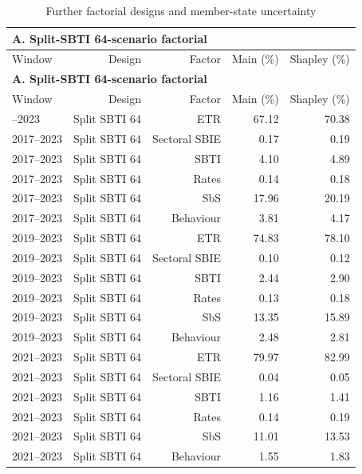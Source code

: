 {\small\setlength{\LTpre}{4pt}\setlength{\LTpost}{4pt}
\begin{longtable}{@{}lrrrr@{}}
\caption{Further factorial designs and member-state uncertainty}\label{tab:tab_v2_app_table5_country_uncertainty} \\
\multicolumn{5}{l}{\textbf{A. Split-SBTI 64-scenario factorial}} \\
\toprule
Window & Design & Factor & Main (\%) & Shapley (\%) \\
\midrule
\endfirsthead
\multicolumn{5}{l}{\textbf{A. Split-SBTI 64-scenario factorial}} \\
\toprule
Window & Design & Factor & Main (\%) & Shapley (\%) \\
\midrule
\endhead
\midrule
\endfoot
\bottomrule
\endlastfoot
2017–2023 & Split SBTI 64 & ETR & 67.12 & 70.38 \\
2017–2023 & Split SBTI 64 & Sectoral SBIE &  0.17 &  0.19 \\
2017–2023 & Split SBTI 64 & SBTI &  4.10 &  4.89 \\
2017–2023 & Split SBTI 64 & Rates &  0.14 &  0.18 \\
2017–2023 & Split SBTI 64 & SbS & 17.96 & 20.19 \\
2017–2023 & Split SBTI 64 & Behaviour &  3.81 &  4.17 \\
2019–2023 & Split SBTI 64 & ETR & 74.83 & 78.10 \\
2019–2023 & Split SBTI 64 & Sectoral SBIE &  0.10 &  0.12 \\
2019–2023 & Split SBTI 64 & SBTI &  2.44 &  2.90 \\
2019–2023 & Split SBTI 64 & Rates &  0.13 &  0.18 \\
2019–2023 & Split SBTI 64 & SbS & 13.35 & 15.89 \\
2019–2023 & Split SBTI 64 & Behaviour &  2.48 &  2.81 \\
2021–2023 & Split SBTI 64 & ETR & 79.97 & 82.99 \\
2021–2023 & Split SBTI 64 & Sectoral SBIE &  0.04 &  0.05 \\
2021–2023 & Split SBTI 64 & SBTI &  1.16 &  1.41 \\
2021–2023 & Split SBTI 64 & Rates &  0.14 &  0.19 \\
2021–2023 & Split SBTI 64 & SbS & 11.01 & 13.53 \\
2021–2023 & Split SBTI 64 & Behaviour &  1.55 &  1.83 \\
\end{longtable}
}
